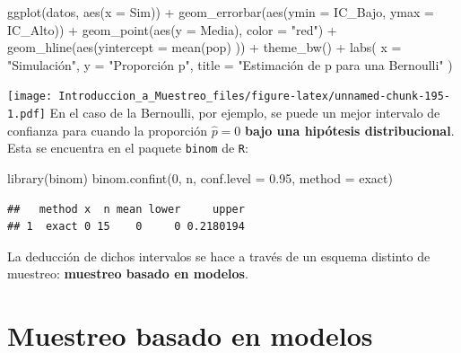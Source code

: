 \documentclass[
]{book}
\newenvironment{Shaded}{\begin{snugshade}}{\end{snugshade}}
\newcommand{\AttributeTok}[1]{\textcolor[rgb]{0.77,0.63,0.00}{#1}}
\newcommand{\DecValTok}[1]{\textcolor[rgb]{0.00,0.00,0.81}{#1}}
\newcommand{\FloatTok}[1]{\textcolor[rgb]{0.00,0.00,0.81}{#1}}
\newcommand{\FunctionTok}[1]{\textcolor[rgb]{0.00,0.00,0.00}{#1}}
\newcommand{\NormalTok}[1]{#1}
\newcommand{\SpecialCharTok}[1]{\textcolor[rgb]{0.00,0.00,0.00}{#1}}
\newcommand{\StringTok}[1]{\textcolor[rgb]{0.31,0.60,0.02}{#1}}
\begin{document}
\begin{Shaded}
\begin{Highlighting}[]
\FunctionTok{ggplot}\NormalTok{(datos, }\FunctionTok{aes}\NormalTok{(}\AttributeTok{x =}\NormalTok{ Sim)) }\SpecialCharTok{+}
  \FunctionTok{geom\_errorbar}\NormalTok{(}\FunctionTok{aes}\NormalTok{(}\AttributeTok{ymin =}\NormalTok{ IC\_Bajo, }\AttributeTok{ymax =}\NormalTok{ IC\_Alto)) }\SpecialCharTok{+}
  \FunctionTok{geom\_point}\NormalTok{(}\FunctionTok{aes}\NormalTok{(}\AttributeTok{y =}\NormalTok{ Media), }\AttributeTok{color =} \StringTok{"red"}\NormalTok{) }\SpecialCharTok{+}
  \FunctionTok{geom\_hline}\NormalTok{(}\FunctionTok{aes}\NormalTok{(}\AttributeTok{yintercept =} \FunctionTok{mean}\NormalTok{(pop) )) }\SpecialCharTok{+}
  \FunctionTok{theme\_bw}\NormalTok{() }\SpecialCharTok{+}
  \FunctionTok{labs}\NormalTok{(}
    \AttributeTok{x =} \StringTok{"Simulación"}\NormalTok{,}
    \AttributeTok{y =} \StringTok{"Proporción p"}\NormalTok{,}
    \AttributeTok{title =} \StringTok{"Estimación de p para una Bernoulli"}
\NormalTok{  )}
\end{Highlighting}
\end{Shaded}

\texttt{[image: Introduccion\_a\_Muestreo\_files/figure-latex/unnamed-chunk-195-1.pdf]}
En el caso de la Bernoulli, por ejemplo, se puede un mejor intervalo de confianza para cuando la proporción \(\hat{p} = 0\) \textbf{bajo una hipótesis distribucional}. Esta se encuentra en el paquete \texttt{binom} de \texttt{R}:

\begin{Shaded}
\begin{Highlighting}[]
\FunctionTok{library}\NormalTok{(binom)}
\FunctionTok{binom.confint}\NormalTok{(}\DecValTok{0}\NormalTok{, n, }\AttributeTok{conf.level =} \FloatTok{0.95}\NormalTok{, }\AttributeTok{method =} \StringTok{\textquotesingle{}exact\textquotesingle{}}\NormalTok{)}
\end{Highlighting}
\end{Shaded}

\begin{verbatim}
##   method x  n mean lower     upper
## 1  exact 0 15    0     0 0.2180194
\end{verbatim}

La deducción de dichos intervalos se hace a través de un esquema distinto de muestreo: \textbf{muestreo basado en modelos}.

\hypertarget{muestreo-basado-en-modelos}{%
\section{Muestreo basado en modelos}\label{muestreo-basado-en-modelos}}
\end{document}
